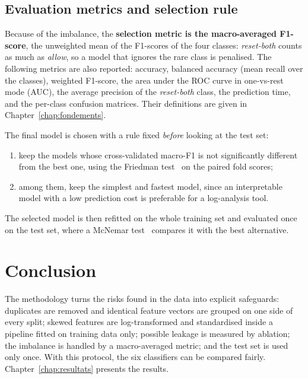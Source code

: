 \subsection{Evaluation metrics and selection rule}
Because of the imbalance, the \textbf{selection metric is the macro-averaged F1-score}, the unweighted mean of the F1-scores of the four classes: \emph{reset-both} counts as much as \emph{allow}, so a model that ignores the rare class is penalised. The following metrics are also reported: accuracy, balanced accuracy (mean recall over the classes), weighted F1-score, the area under the \ac{ROC} curve in one-vs-rest mode (\ac{AUC}), the average precision of the \emph{reset-both} class, the prediction time, and the per-class confusion matrices. Their definitions are given in Chapter~\ref{chap:fondements}.

The final model is chosen with a rule fixed \emph{before} looking at the test set:
\begin{enumerate}
  \item keep the models whose cross-validated macro-F1 is not significantly different from the best one, using the Friedman test~\cite{friedman1937use} on the paired fold scores;
  \item among them, keep the simplest and fastest model, since an interpretable model with a low prediction cost is preferable for a log-analysis tool.
\end{enumerate}
The selected model is then refitted on the whole training set and evaluated once on the test set, where a McNemar test~\cite{mcnemar1947note} compares it with the best alternative.

\section{Conclusion}
The methodology turns the risks found in the data into explicit safeguards: duplicates are removed and identical feature vectors are grouped on one side of every split; skewed features are log-transformed and standardised inside a pipeline fitted on training data only; possible leakage is measured by ablation; the imbalance is handled by a macro-averaged metric; and the test set is used only once. With this protocol, the six classifiers can be compared fairly. Chapter~\ref{chap:resultats} presents the results.
